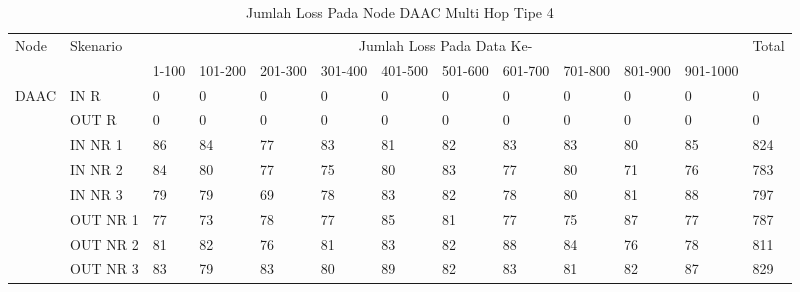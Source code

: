 \begin{table}[H]
  \centering
  \caption{Jumlah Loss Pada Node DAAC Multi Hop Tipe 4}
    \begin{tabular}{|p{1cm}|p{1.9cm}|p{0.6cm}|p{0.6cm}|p{0.6cm}|p{0.6cm}|p{0.6cm}|p{0.6cm}|p{0.6cm}|p{0.6cm}|p{0.6cm}|p{0.6cm}|p{1cm}|}
    \hline
        \multirow{2}{*}{Node}&\multirow{2}{*}{Skenario}&\multicolumn{10}{|c|}{Jumlah Loss Pada Data Ke-}&\multirow{2}{*}{Total} \\\cline{3-12}
          & & 1-100 & 101-200 & 201-300 & 301-400 & 401-500 & 501-600 & 601-700 & 701-800 & 801-900 & 901-1000 & \\
        \hline
    \multirow{8}{*}{DAAC}  
    & IN R  & 0     & 0     & 0     & 0     & 0     & 0     & 0     & 0     & 0     & 0     & 0 \\
          & OUT R & 0     & 0     & 0     & 0     & 0     & 0     & 0     & 0     & 0     & 0     & 0 \\
          & IN NR 1 & 86    & 84    & 77    & 83    & 81    & 82    & 83    & 83    & 80    & 85    & 824 \\
          & IN NR 2 & 84    & 80    & 77    & 75    & 80    & 83    & 77    & 80    & 71    & 76    & 783 \\
          & IN NR 3 & 79    & 79    & 69    & 78    & 83    & 82    & 78    & 80    & 81    & 88    & 797 \\
          & OUT NR 1 & 77    & 73    & 78    & 77    & 85    & 81    & 77    & 75    & 87    & 77    & 787 \\
          & OUT NR 2 & 81    & 82    & 76    & 81    & 83    & 82    & 88    & 84    & 76    & 78    & 811 \\
          & OUT NR 3 & 83    & 79    & 83    & 80    & 89    & 82    & 83    & 81    & 82    & 87    & 829 \\
    
    \hline
    \end{tabular}%
  \label{tab:addlabel}%
\end{table}%
